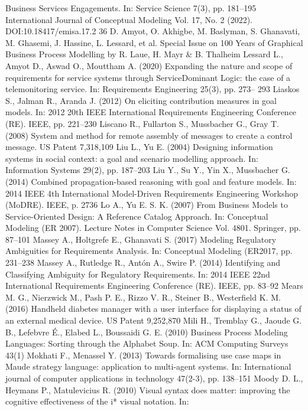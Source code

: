 Business Services Engagements. In: Service Science 7(3), pp. 181–195
International Journal of Conceptual Modeling
Vol. 17, No. 2 (2022). DOI:10.18417/emisa.17.2
36 D. Amyot, O. Akhigbe, M. Baslyman, S. Ghanavati, M. Ghasemi, J. Hassine, L. Lessard, et al.
Special Issue on 100 Years of Graphical Business Process Modelling by R. Laue, H. Mayr & B. Thalheim
Lessard L., Amyot D., Aswad O., Mouttham A.
(2020) Expanding the nature and scope of requirements for service systems through ServiceDominant Logic: the case of a telemonitoring service. In: Requirements Engineering 25(3), pp. 273–
293
Liaskos S., Jalman R., Aranda J. (2012) On eliciting contribution measures in goal models. In:
2012 20th IEEE International Requirements Engineering Conference (RE). IEEE, pp. 221–230
Liscano R., Fullarton S., Mussbacher G., Gray T.
(2008) System and method for remote assembly of
messages to create a control message. US Patent
7,318,109
Liu L., Yu E. (2004) Designing information systems in social context: a goal and scenario modelling approach. In: Information Systems 29(2),
pp. 187–203
Liu Y., Su Y., Yin X., Mussbacher G. (2014)
Combined propagation-based reasoning with goal
and feature models. In: 2014 IEEE 4th International Model-Driven Requirements Engineering
Workshop (MoDRE). IEEE, p. 2736
Lo A., Yu E. S. K. (2007) From Business Models
to Service-Oriented Design: A Reference Catalog
Approach. In: Conceptual Modeling (ER 2007).
Lecture Notes in Computer Science Vol. 4801.
Springer, pp. 87–101
Massey A., Holtgrefe E., Ghanavati S. (2017) Modeling Regulatory Ambiguities for Requirements
Analysis. In: Conceptual Modeling (ER2017,
pp. 231–238
Massey A., Rutledge R., Antón A., Swire P. (2014)
Identifying and Classifying Ambiguity for Regulatory Requirements. In: 2014 IEEE 22nd International Requirements Engineering Conference
(RE). IEEE, pp. 83–92
Mears M. G., Nierzwick M., Pash P. E., Rizzo
V. R., Steiner B., Westerfield K. M. (2016) Handheld diabetes manager with a user interface for
displaying a status of an external medical device.
US Patent 9,252,870
Mili H., Tremblay G., Jaoude G. B., Lefebvre
É., Elabed L., Boussaidi G. E. (2010) Business
Process Modeling Languages: Sorting through
the Alphabet Soup. In: ACM Computing Surveys
43(1)
Mokhati F., Menassel Y. (2013) Towards formalising use case maps in Maude strategy language: application to multi-agent systems. In: International
journal of computer applications in technology
47(2-3), pp. 138–151
Moody D. L., Heymans P., Matulevicius R. (2010)
Visual syntax does matter: improving the cognitive effectiveness of the i* visual notation. In:
